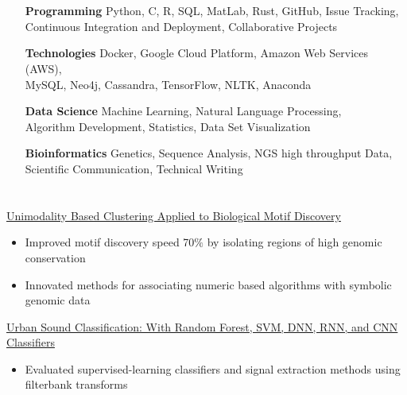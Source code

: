 \documentclass[hidelinks, 11pt]{article}
\begin{document}
\section*{}
\begin{addmargin}{1.6in}
  \begin{itemize}\setlength\itemsep{-4pt}
    \item[{\bf Programming}]{Python, C, R, SQL, MatLab, Rust, GitHub, Issue Tracking, \\ 
                             Continuous Integration and Deployment, Collaborative Projects}
    \item[{\bf Technologies}]{Docker, Google Cloud Platform, Amazon Web Services (AWS), \\
                              MySQL, Neo4j, Cassandra, TensorFlow, NLTK, Anaconda}
    \item[{\bf Data Science}]{Machine Learning, Natural Language Processing, \\
                              Algorithm Development, Statistics, Data Set Visualization}
    \item[{\bf Bioinformatics}]{Genetics, Sequence Analysis, NGS high throughput Data, \\
                                Scientific Communication, Technical Writing}
  \end{itemize}
\end{addmargin}
\vspace{-6pt}

\section*{}
\begin{addmargin}{.5in}
  {\href{https://benjamindoran.github.io/motif-paper/}{\color{blue}Unimodality Based Clustering Applied to Biological Motif Discovery}}
  \begin{itemize}\setlength\itemsep{-4pt}
    \item{Improved motif discovery speed 70$\%$ by isolating regions of high genomic conservation} 
    \item{Innovated methods for associating numeric based algorithms with symbolic genomic data}
  \end{itemize}
  {\href{https://github.com/BenjaminDoran/Urban-Sound-Classification/}{\color{blue}Urban Sound Classification: With Random Forest, SVM, DNN, RNN, and CNN Classifiers}}
  \begin{itemize}\setlength\itemsep{-4pt}
    \item{Evaluated supervised-learning classifiers and signal extraction methods using filterbank transforms}
  \end{itemize}
\end{addmargin}
\vspace{-6pt}
\end{document}
